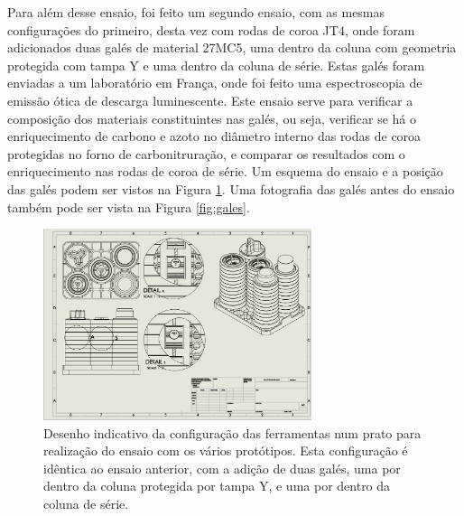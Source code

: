 \par
Para além desse ensaio, foi feito um segundo ensaio, com as mesmas configurações do primeiro, desta vez com rodas de coroa JT4, onde foram adicionados duas galés de material 27MC5, uma dentro da coluna com geometria protegida com tampa Y e uma dentro da coluna de série. Estas galés foram enviadas a um laboratório em França, onde foi feito uma espectroscopia de emissão ótica de descarga luminescente. Este ensaio serve para verificar a composição dos materiais constituintes nas galés, ou seja, verificar se há o enriquecimento de carbono e azoto no diâmetro interno das rodas de coroa protegidas no forno de carbonitruração, e comparar os resultados com o enriquecimento nas rodas de coroa de série. Um esquema do ensaio e a posição das galés podem ser vistos na Figura \ref{fig:ensaio_gales}. Uma fotografia das galés antes do ensaio também pode ser vista na Figura \ref{fig:gales}.
\begin{figure}[htb!]
    \centering
    \includegraphics[width = 0.7\textwidth]{Figures/Cap3/Layout_ensaio_gallets.png}
    \caption[Desenho com a configuração do ensaio das galés]%
    {Desenho indicativo da configuração das ferramentas num prato para realização do ensaio com os vários protótipos. Esta configuração é idêntica ao ensaio anterior, com a adição de duas galés, uma por dentro da coluna protegida por tampa Y, e uma por dentro da coluna de série.}
    \label{fig:ensaio_gales}
\end{figure}
\newpage
